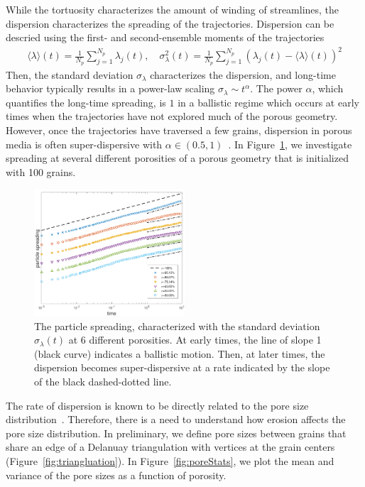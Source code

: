 \documentclass[11pt]{article}
\begin{document}
While the tortuosity characterizes the amount of winding of streamlines,
the dispersion characterizes the spreading of the trajectories.
Dispersion can be descried using the first- and second-ensemble moments
of the trajectories
\begin{align}
  \langle \lambda \rangle (t) = \frac{1}{N_p} \sum_{j=1}^{N_p}
    \lambda_j(t), \quad \sigma_\lambda^{2}(t) = \frac{1}{N_p}
    \sum_{j=1}^{N_p} (\lambda_j(t) - \langle \lambda \rangle(t))^2
\end{align}
Then, the standard deviation $\sigma_\lambda$ characterizes the
dispersion, and long-time behavior typically results in a power-law
scaling $\sigma_\lambda \sim t^{\alpha}$. The power $\alpha$, which
quantifies the long-time spreading, is $1$ in a ballistic regime which
occurs at early times when the trajectories have not explored much of
the porous geometry. However, once the trajectories have traversed a few
grains, dispersion in porous media is often super-dispersive with
$\alpha \in (0.5,1)$~\cite{}. In Figure~\ref{fig:100dispersion}, we
investigate spreading at several different porosities of a porous
geometry that is initialized with 100 grains.
\begin{figure}
  \includegraphics[width=0.5\textwidth]{figs/100b_second_moment_long_ref}
  \caption{\label{fig:100dispersion} The particle spreading,
  characterized with the standard deviation $\sigma_\lambda(t)$ at 6
  different porosities. At early times, the line of slope 1 (black
  curve) indicates a ballistic motion. Then, at later times, the
  dispersion becomes super-dispersive at a rate indicated by the slope
  of the black dashed-dotted line.}
\end{figure}

The rate of dispersion is known to be directly related to the pore size
distribution~\cite{dea-qua-bir-jua2018}. Therefore, there is a need to
understand how erosion affects the pore size distribution. In
preliminary, we define pore sizes between grains that share an edge of a
Delanuay triangulation with vertices at the grain centers
(Figure~\ref{fig:triangluation}). In Figure~\ref{fig:poreStats}, we plot
the mean and variance of the pore sizes as a function of porosity.
\end{document}
